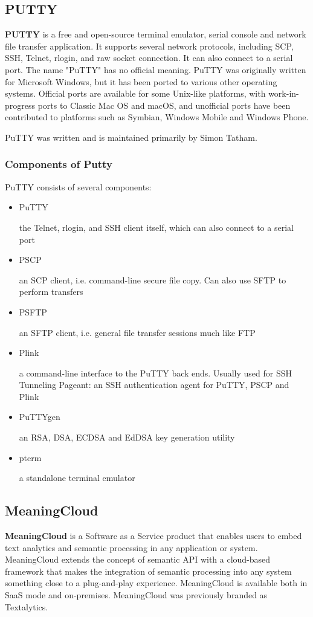 \documentclass[oneside,a4paper,12pt]{book}
\begin{document}
\subsection{PUTTY}
\textbf{PUTTY} is a free and open-source terminal emulator, serial console and network file transfer application. It supports several network protocols, including SCP, SSH, Telnet, rlogin, and raw socket connection. It can also connect to a serial port. The name "PuTTY" has no official meaning.
PuTTY was originally written for Microsoft Windows, but it has been ported to various other operating systems. Official ports are available for some Unix-like platforms, with work-in-progress ports to Classic Mac OS and macOS, and unofficial ports have been contributed to platforms such as Symbian, Windows Mobile and Windows Phone.

PuTTY was written and is maintained primarily by Simon Tatham.
\subsubsection{Components of Putty}
PuTTY consists of several components:
\begin{itemize}
    \item PuTTY 
    \par the Telnet, rlogin, and SSH client itself, which can also connect to a serial port
    \item PSCP
    \par an SCP client, i.e. command-line secure file copy. Can also use SFTP to perform transfers
    \item PSFTP
    \par an SFTP client, i.e. general file transfer sessions much like FTP
    \item Plink
    \par a command-line interface to the PuTTY back ends. Usually used for SSH Tunneling
    Pageant: an SSH authentication agent for PuTTY, PSCP and Plink
    \item PuTTYgen
    \par an RSA, DSA, ECDSA and EdDSA key generation utility
    \item pterm
    \par a standalone terminal emulator
\end{itemize}
\subsection{MeaningCloud}
\textbf{MeaningCloud} is a Software as a Service product that enables users to embed text analytics and semantic processing in any application or system. MeaningCloud extends the concept of semantic API with a cloud-based framework that makes the integration of semantic processing into any system something close to a plug-and-play experience. MeaningCloud is available both in SaaS mode and on-premises. MeaningCloud was previously branded as Textalytics.
\end{document}
